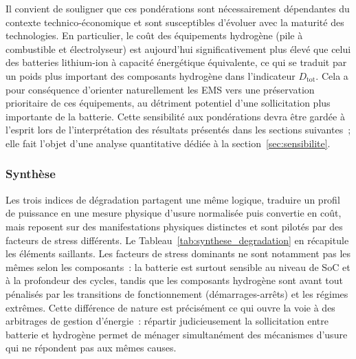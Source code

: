 Il convient de souligner que ces pondérations sont nécessairement dépendantes du contexte technico-économique et sont susceptibles d'évoluer avec la maturité des technologies. En particulier, le coût des équipements hydrogène (pile à combustible et électrolyseur) est aujourd'hui significativement plus élevé que celui des batteries lithium-ion à capacité énergétique équivalente, ce qui se traduit par un poids plus important des composants hydrogène dans l'indicateur $D_{\text{tot}}$. Cela a pour conséquence d'orienter naturellement les EMS vers une préservation prioritaire de ces équipements, au détriment potentiel d'une sollicitation plus importante de la batterie. Cette sensibilité aux pondérations devra être gardée à l'esprit lors de l'interprétation des résultats présentés dans les sections suivantes~; elle fait l'objet d'une analyse quantitative dédiée à la section~\ref{sec:sensibilite}.

\subsubsection{Synthèse}

Les trois indices de dégradation partagent une même logique, traduire un profil de puissance en une mesure physique d'usure normalisée puis convertie en coût, mais reposent sur des manifestations physiques distinctes et sont pilotés par des facteurs de stress différents. Le Tableau~\ref{tab:synthese_degradation} en récapitule les éléments saillants. Les facteurs de stress dominants ne sont notamment pas les mêmes selon les composants~: la batterie est surtout sensible au niveau de SoC et à la profondeur des cycles, tandis que les composants hydrogène sont avant tout pénalisés par les transitions de fonctionnement (démarrages-arrêts) et les régimes extrêmes. Cette différence de nature est précisément ce qui ouvre la voie à des arbitrages de gestion d'énergie~: répartir judicieusement la sollicitation entre batterie et hydrogène permet de ménager simultanément des mécanismes d'usure qui ne répondent pas aux mêmes causes.

